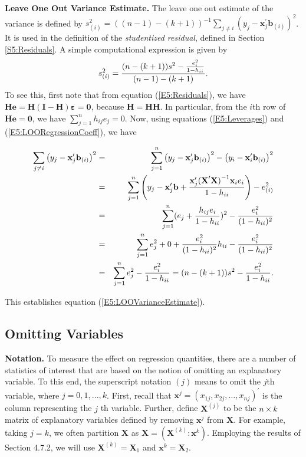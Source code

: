 \textbf{Leave One Out Variance Estimate.} The leave one out estimate
of the variance is defined by
$s_{(i)}^2=((n-1)-(k+1))^{-1}\sum_{j\neq i}\left(
y_j-\mathbf{x}_j^{\prime}\mathbf{b}_{(i)}\right) ^2$. It is used in
the definition of the \textit{studentized residual}, defined in
Section \ref{S5:Residuals}. A simple computational expression is
given by
\begin{equation}\label{E5:LOOVarianceEstimate}
s_{(i)}^2=\frac{(n-(k+1))s^2-\frac{e_i^2}{1-h_{ii}}}{%
(n-1)-(k+1)}.
\end{equation}
To see this, first note that from equation (\ref{E5:Residuals}), we have $\mathbf{He%
}=\mathbf{H(I-H)\boldsymbol \varepsilon}=\mathbf{0}$, because
$\mathbf{H}=\mathbf{HH}$. In
particular, from the $i$th row of $\mathbf{He}=\mathbf{0}$, we have $%
\sum_{j=1}^{n}h_{ij}e_j=0$. Now, using equations
(\ref{E5:Leverages}) and (\ref{E5:LOORegressionCoeff}), we have

\begin{center}
\begin{eqnarray*}
\sum_{j\neq i}\left(
y_j-\mathbf{x}_j^{\prime}\mathbf{b}_{(i)}\right)
^2 &=&\sum_{j=1}^{n}\left( y_j-\mathbf{x}_j^{\prime}\mathbf{b}%
_{(i)}\right) ^2-\left( y_i-\mathbf{x}_i^{\prime}\mathbf{b}%
_{(i)}\right) ^2 \\
&=&\sum_{j=1}^{n}\left( y_j-\mathbf{x}_j^{\prime}\mathbf{b}+\frac{%
\mathbf{x}_j^{\prime}\mathbf{(X}^{\prime}\mathbf{X)}^{-1}\mathbf{x}_i%
e_i}{1-h_{ii}}\right) -e_{(i)}^2 \\
&=&\sum_{j=1}^{n}(e_j+\frac{h_{ij}e_i}{1-h_{ii}})^2-\frac{%
e_i^2}{(1-h_{ii})^2} \\
&=&\sum_{j=1}^{n}e_j^2+0+\frac{e_i^2}{(1-h_{ii})^2}%
h_{ii}-\frac{e_i^2}{(1-h_{ii})^2} \\
&=&\sum_{j=1}^{n}e_j^2-\frac{e_i^2}{1-h_{ii}}%
=(n-(k+1))s^2-\frac{e_i^2}{1-h_{ii}}.
\end{eqnarray*}%
\qquad
\end{center}

This establishes equation (\ref{E5:LOOVarianceEstimate}).

\subsection{Omitting Variables}

\textbf{Notation.} To measure the effect on regression quantities,
there are a number of statistics of interest that are based on the
notion of omitting an explanatory variable. To this end, the
superscript notation $(j)$ means to omit the $j$th variable, where
$j=0,1,...,k$. First, recall that
$\mathbf{x}^{j}=(x_{1j},x_{2j},\ldots,x_{nj})^{\prime}$ is the
column representing the $j$ th variable. Further, define
$\mathbf{X}^{(j)}$ to be the $n\times k$ matrix of explanatory
variables defined by removing $\mathbf{x}^{j}$ from $\mathbf{X}$.
For example, taking $j=k$, we often partition $\mathbf{X}$ as
$\mathbf{X} =\left( \mathbf{X}^{(k)}: \mathbf{x}^k \right) $.
Employing the results of Section 4.7.2, we will use
$\mathbf{X}^{(k)} = \mathbf{X}_1$ and $\mathbf{x}^k =
\mathbf{X}_2.$


